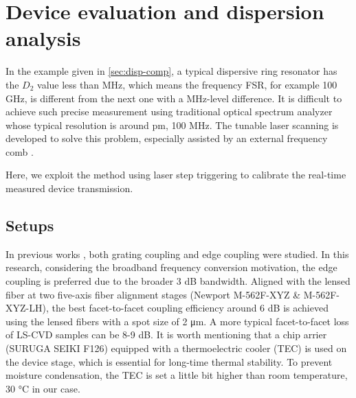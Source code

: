 
\chapter{Device evaluation and dispersion analysis}%


In the example given in \autoref{sec:disp-comp},  a typical dispersive ring resonator has the $ D_2 $ value less than MHz, which means the frequency FSR, for example 100 GHz, is different from the next one with a MHz-level difference. 
It is difficult to achieve such precise measurement using traditional optical spectrum analyzer whose typical resolution is around pm, 100 MHz. The tunable laser scanning is developed to solve this problem, especially assisted by an external frequency comb \cite{Liu2016d}. 

Here, we exploit the method using laser step triggering to calibrate the real-time measured device transmission.


\section{Setups}

In previous works \cite{Sunada2018}, both grating coupling and edge coupling were studied. In this research, considering the broadband frequency conversion motivation, the edge coupling is preferred due to the broader 3 dB bandwidth. Aligned with the lensed fiber at two five-axis fiber alignment stages (Newport M-562F-XYZ \& M-562F-XYZ-LH), the best facet-to-facet coupling efficiency around 6 dB is achieved using the lensed fibers with a spot size of 2 \si{\um}.
A more typical facet-to-facet loss of LS-CVD samples can be 8-9 dB.
It is worth mentioning that a chip arrier (SURUGA SEIKI F126) equipped with a thermoelectric cooler (TEC) is used on the device stage, which is essential for long-time thermal stability. To prevent moisture condensation, the TEC is set a little bit higher than room temperature, 30 \si{\celsius} in our case. 


\begin{figure}
	\centering
	
	\label{fig:transsetup}
\end{figure}

